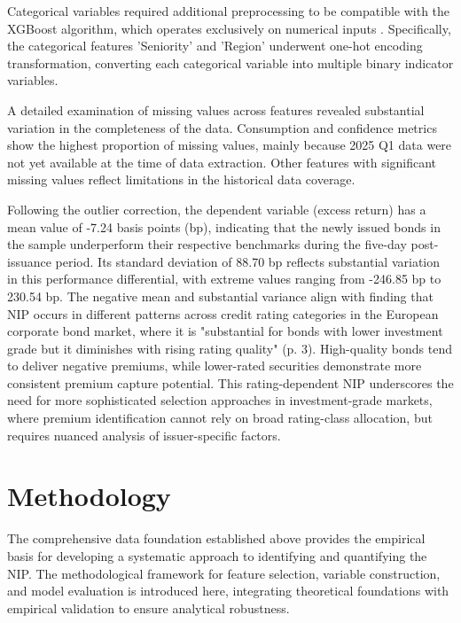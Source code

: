 Categorical variables required additional preprocessing to be compatible with the XGBoost algorithm, which operates exclusively on numerical inputs \parencite{Harrison2023EffectiveModels}. Specifically, the categorical features 'Seniority' and 'Region' underwent one-hot encoding transformation, converting each categorical variable into multiple binary indicator variables.

A detailed examination of missing values across features revealed substantial variation in the completeness of the data. Consumption and confidence metrics show the highest proportion of missing values, mainly because 2025 Q1 data were not yet available at the time of data extraction. Other features with significant missing values reflect limitations in the historical data coverage.

Following the outlier correction, the dependent variable (excess return) has a mean value of -7.24 basis points (bp), indicating that the newly issued bonds in the sample underperform their respective benchmarks during the five-day post-issuance period. Its standard deviation of 88.70 bp reflects substantial variation in this performance differential, with extreme values ranging from -246.85 bp to 230.54 bp. The negative mean and substantial variance align with \textcite{Traczyk2024NewFactor} finding that NIP occurs in different patterns across credit rating categories in the European corporate bond market, where it is "substantial for bonds with lower investment grade but it diminishes with rising rating quality" (p. 3). High-quality bonds tend to deliver negative premiums, while lower-rated securities demonstrate more consistent premium capture potential. This rating-dependent NIP underscores the need for more sophisticated selection approaches in investment-grade markets, where premium identification cannot rely on broad rating-class allocation, but requires nuanced analysis of issuer-specific factors.

\section{Methodology}
\label{sec:methodology}

The comprehensive data foundation established above provides the empirical basis for developing a systematic approach to identifying and quantifying the NIP. The methodological framework for feature selection, variable construction, and model evaluation is introduced here, integrating theoretical foundations with empirical validation to ensure analytical robustness.

